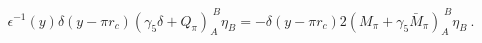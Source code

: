 \begin{equation} \label{warunkibrzegpi}
  \epsilon^{-1}(y) \delta(y-\pi r_{c}) (\gamma_5\delta+Q_{\pi})_A^{\;B}\eta_B=-\delta(y-\pi r_{c})2(M_{\pi}+\gamma_{5}\bar{M}_{\pi})_A^{\;B}\eta_B\ .
    \end{equation} 
